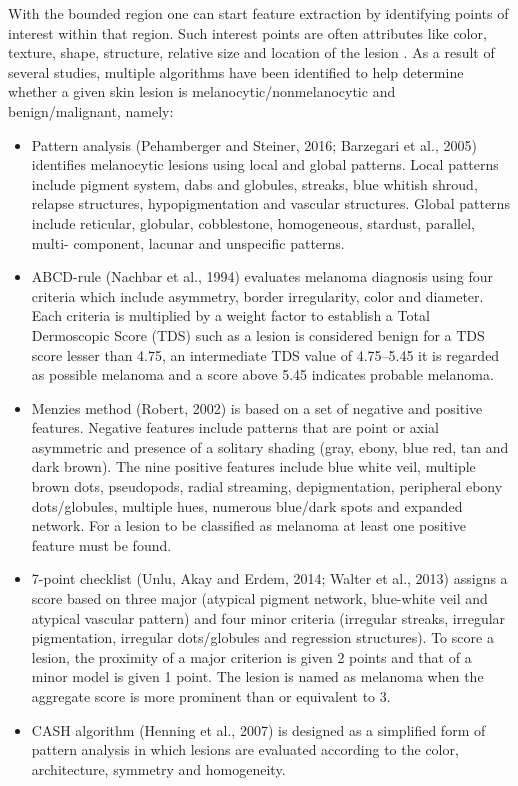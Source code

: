 With the bounded region one can start feature extraction by identifying points of interest within that region. Such interest points are often attributes like color, texture, shape, structure, relative size and location of the lesion \cite{Barata2014}. As a result of several studies, multiple algorithms have been identified to help determine whether a given skin lesion is melanocytic/nonmelanocytic and benign/malignant, namely: 
\begin{itemize}
    \item Pattern analysis (Pehamberger and Steiner, 2016; Barzegari et al., 2005) identifies melanocytic lesions using local and global patterns. Local patterns include pigment system, dabs and globules, streaks, blue whitish shroud, relapse structures, hypopigmentation and vascular structures. Global patterns include reticular, globular, cobblestone, homogeneous, stardust, parallel, multi- component, lacunar and unspecific patterns.
    \item ABCD-rule (Nachbar et al., 1994) evaluates melanoma diagnosis using four criteria which include asymmetry, border irregularity, color and diameter. Each criteria is multiplied by a weight factor to establish a Total Dermoscopic Score (TDS) such as a lesion is considered benign for a TDS score lesser than 4.75, an intermediate TDS value of 4.75–5.45 it is regarded as possible melanoma and a score above 5.45 indicates probable melanoma.
    \item Menzies method (Robert, 2002) is based on a set of negative and positive features. Negative features include patterns that are point or axial asymmetric and presence of a solitary shading (gray, ebony, blue red, tan and dark brown). The nine positive features include blue white veil, multiple brown dots, pseudopods, radial streaming, depigmentation, peripheral ebony dots/globules, multiple hues, numerous blue/dark spots and expanded network. For a lesion to be classified as melanoma at least one positive feature must be found.
    \item 7-point checklist (Unlu, Akay and Erdem, 2014; Walter et al., 2013) assigns a score based on three major (atypical pigment network, blue-white veil and atypical vascular pattern) and four minor criteria (irregular streaks, irregular pigmentation, irregular dots/globules and regression structures). To score a lesion, the proximity of a major criterion is given 2 points and that of a minor model is given 1 point. The lesion is named as melanoma when the aggregate score is more prominent than or equivalent to 3.
    \item CASH algorithm (Henning et al., 2007) is designed as a simplified form of pattern analysis in which lesions are evaluated according to the color, architecture, symmetry and homogeneity.
\end{itemize}


